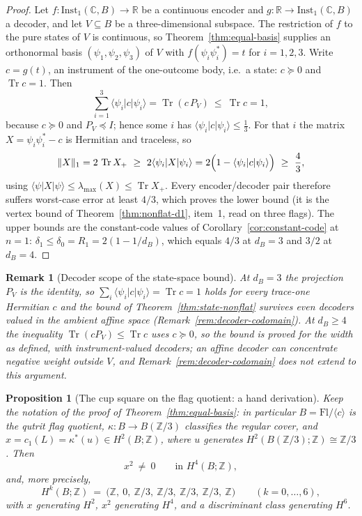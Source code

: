 \documentclass[11pt,a4paper]{article}
\newtheorem{proposition}[theorem]{Proposition}
\newtheorem{remark}[theorem]{Remark}
\newcommand{\Inst}{\mathrm{Inst}}
\newcommand{\Tr}{\operatorname{Tr}}
\begin{document}
\begin{proof}
Let $f\colon\Inst_1(\mathbb C,B)\to\mathbb R$ be a continuous encoder and
$g\colon\mathbb R\to\Inst_1(\mathbb C,B)$ a decoder, and let $V\subseteq B$ be a
three-dimensional subspace. The restriction of $f$ to the pure states of $V$ is
continuous, so Theorem~\ref{thm:equal-basis} supplies an orthonormal basis
$(\psi_1,\psi_2,\psi_3)$ of $V$ with
$f(\psi_i\psi_i^*)=t$ for $i=1,2,3$. Write $c=g(t)$, an instrument of the
one-outcome body, i.e.\ a state: $c\succeq0$ and $\Tr c=1$. Then
\[
\sum_{i=1}^3\langle\psi_i|c|\psi_i\rangle
=\Tr(c\,P_V)\ \le\ \Tr c=1,
\]
because $c\succeq0$ and $P_V\preceq I$; hence some $i$ has
$\langle\psi_i|c|\psi_i\rangle\le\tfrac13$. For that $i$ the matrix
$X=\psi_i\psi_i^*-c$ is Hermitian and traceless, so
\[
\|X\|_1=2\,\Tr X_+\ \ge\ 2\langle\psi_i|X|\psi_i\rangle
=2\Bigl(1-\langle\psi_i|c|\psi_i\rangle\Bigr)\ \ge\ \frac43,
\]
using $\langle\psi|X|\psi\rangle\le\lambda_{\max}(X)\le\Tr X_+$. Every
encoder/decoder pair therefore suffers worst-case error at least $4/3$, which
proves the lower bound (it is the vertex bound of Theorem~\ref{thm:nonflat-d1},
item~1, read on three flags). The upper bounds are the constant-code values of
Corollary~\ref{cor:constant-code} at $n=1$:
$\delta_1\le\delta_0=R_1=2(1-1/d_B)$, which equals $4/3$ at $d_B=3$ and $3/2$ at
$d_B=4$.
\end{proof}

\begin{remark}[Decoder scope of the state-space bound]
\label{rem:affine-scope}
At $d_B=3$ the projection $P_V$ is the identity, so
$\sum_i\langle\psi_i|c|\psi_i\rangle=\Tr c=1$ holds for every trace-one
Hermitian $c$ and the bound of Theorem~\ref{thm:state-nonflat} survives even
decoders valued in the ambient affine space (Remark~\ref{rem:decoder-codomain}).
At $d_B\ge4$ the inequality $\Tr(cP_V)\le\Tr c$ uses $c\succeq0$, so the bound is
proved for the width as defined, with instrument-valued decoders; an affine
decoder can concentrate negative weight outside $V$, and
Remark~\ref{rem:decoder-codomain} does not extend to this argument. \end{remark}


\begin{proposition}[The cup square on the flag quotient: a hand derivation]
\label{prop:cupsquare}
Keep the notation of the proof of Theorem~\ref{thm:equal-basis}: in
particular $B=\mathrm{Fl}/\langle c\rangle$ is the qutrit flag quotient,
$\kappa\colon B\to B(\mathbb Z/3)$ classifies the regular cover, and
$x=c_1(L)=\kappa^*(u)\in H^2(B;\mathbb Z)$, where $u$ generates
$H^2(B(\mathbb Z/3);\mathbb Z)\cong\mathbb Z/3$. Then
\[
x^2\ \ne\ 0\qquad\text{in }H^4(B;\mathbb Z),
\]
and, more precisely,
\[
H^k(B;\mathbb Z)\ =\ \bigl(\mathbb Z,\ 0,\ \mathbb Z/3,\ \mathbb Z/3,\
\mathbb Z/3,\ \mathbb Z/3,\ \mathbb Z\bigr)\qquad(k=0,\dots,6),
\]
with $x$ generating $H^2$, $x^2$ generating $H^4$, and a discriminant class
generating $H^6$.
\end{proposition}
\end{document}
